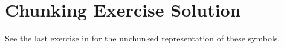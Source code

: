 \chapter{Chunking Exercise Solution}\label{s:chunking}

See the last exercise in  for the unchunked representation of these symbols.

